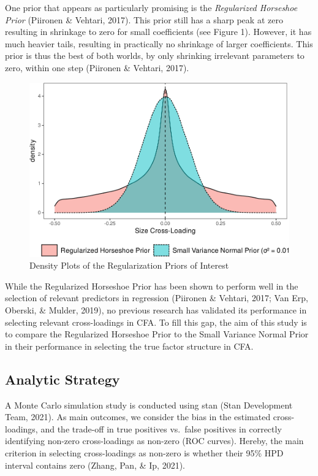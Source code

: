\documentclass[
  man]{apa6}
\begin{document}
One prior that appears as particularly promising is the \emph{Regularized Horseshoe Prior}
(Piironen \& Vehtari, 2017). This prior still has a sharp peak at zero resulting in shrinkage to zero for small coefficients (see Figure 1). However, it has much heavier tails, resulting in practically no shrinkage of larger coefficients. This prior is thus the best of both worlds, by only shrinking irrelevant parameters to zero, within one step (Piironen \& Vehtari, 2017).

\begin{figure}
\centering
\includegraphics{JMBKoch_Proposal_files/figure-latex/unnamed-chunk-1-1.pdf}
\caption{\label{fig:unnamed-chunk-1}Density Plots of the Regularization Priors of Interest}
\end{figure}

While the Regularized Horseshoe Prior has been shown to perform well in
the selection of relevant predictors in regression
(Piironen \& Vehtari, 2017; Van Erp, Oberski, \& Mulder, 2019), no previous research
has validated its performance in selecting relevant cross-loadings in
CFA. To fill this gap, the aim of this study is to compare the
Regularized Horseshoe Prior to the Small Variance Normal Prior in their
performance in selecting the true factor structure in CFA.

\hypertarget{analytic-strategy}{%
\subsection{Analytic Strategy}\label{analytic-strategy}}

A Monte Carlo simulation study is conducted using stan
(Stan Development Team, 2021). As main outcomes, we consider the bias in the estimated cross-loadings, and the trade-off in true positives vs.~false positives in correctly identifying non-zero cross-loadings as non-zero (ROC curves). Hereby, the main criterion in selecting cross-loadings as non-zero is whether their 95\% HPD interval contains zero (Zhang, Pan, \& Ip, 2021).
\end{document}
